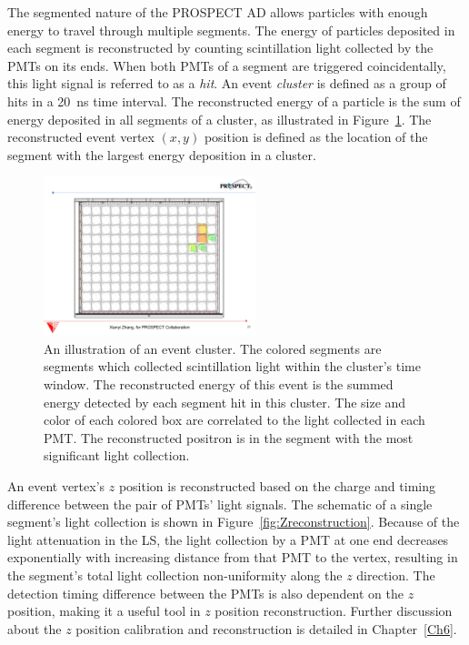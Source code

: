 	The segmented nature of the PROSPECT AD allows particles with enough energy to travel through multiple segments.
	The energy of particles deposited in each segment is reconstructed by counting scintillation light collected by the PMTs on its ends.
	When both PMTs of a segment are triggered coincidentally, this light signal is referred to as a \textit{hit}.
	An event \textit{cluster} is defined as a group of hits in a 20~ns time interval. 
	The reconstructed energy of a particle is the sum of energy deposited in all segments of a cluster, as illustrated in Figure~\ref{fig:ClusterScheme}.
	The reconstructed event vertex $(x, y)$ position is defined as the location of the segment with the largest energy deposition in a cluster.
\begin{figure}[h]
    \centering
    \includegraphics[width=0.55\textwidth]{Figures/ClusterScheme.pdf}
    \caption[An illustration of an event cluster]{
	An illustration of an event cluster. The colored segments are segments which collected scintillation light within the cluster's time window.
	The reconstructed energy of this event is the summed energy detected by each segment hit in this cluster.
	The size and color of each colored box are correlated to the light collected in each PMT.
	The reconstructed positron is in the segment with the most significant light collection.
	}
    \label{fig:ClusterScheme}
\end{figure}
	
	An event vertex's $z$ position is reconstructed based on the charge and timing difference between the pair of PMTs' light signals.
	The schematic of a single segment's light collection is shown in Figure~\ref{fig:Zreconstruction}.
	Because of the light attenuation in the LS, the light collection by a PMT at one end decreases exponentially with increasing distance from that PMT to the vertex, resulting in the segment's total light collection non-uniformity along the $z$ direction.
	The detection timing difference between the PMTs is also dependent on the $z$ position, making it a useful tool in $z$ position reconstruction.
	Further discussion about the $z$ position calibration and reconstruction is detailed in Chapter~\ref{Ch6}.
	
